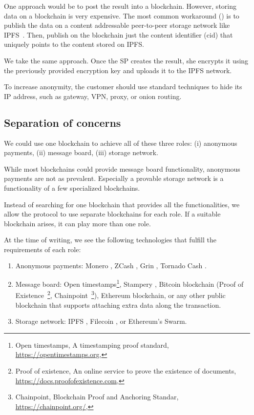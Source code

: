 One approach would be to post the result into a blockchain. However, storing data on a blockchain is very expensive. The most common workaround (\cite{shahidBlockchainBasedAgriFoodSupply2020, wangAuditableProtocolsFair2019, chenImprovedP2PFile2017}) is to publish the data on a content addressable peer-to-peer storage network like IPFS~\cite{benetIPFSContentAddressed2014}. Then, publish on the blockchain just the content identifier ($\mathrm{cid}$) that uniquely points to the content stored on IPFS.

We take the same approach. Once the SP creates the result, she encrypts it using the previously provided encryption key and uploads it to the IPFS network.

To increase anonymity, the customer should use standard techniques to hide its IP address, such as gateway, VPN, proxy, or onion routing.

\subsection{Separation of concerns}
We could use one blockchain to achieve all of these three roles: (i) anonymous payments, (ii) message board, (iii) storage network.

While most blockchains could provide message board functionality, anonymous payments are not as prevalent. Especially a provable storage network is a functionality of a few specialized blockchains.

Instead of searching for one blockchain that provides all the functionalities, we allow the protocol to use separate blockchains for each role. If a suitable blockchain arises, it can play more than one role.

At the time of writing, we see the following technologies that fulfill the requirements of each role:

\begin{enumerate}
\def\labelenumi{\arabic{enumi}.}

\item Anonymous payments: Monero \cite{vansaberhagenCryptoNote2013}, ZCash
  \cite{ben-sassonZerocashDecentralizedAnonymous2014}, Grin \cite{fuchsbauerAggregateCashSystems2019},
  Tornado Cash \cite{pertsevTornadoCashPrivacy2019}.
\item Message board: Open timestamps\footnote{Open timestamps, A timestamping proof standard, \url{https://opentimestamps.org}, \LASTVISITED}, Stampery \cite{crespoStamperyBlockchainTimestamping2017}, Bitcoin blockchain (Proof of Existence~\footnote{Proof of existence, An online service to prove the existence of documents, \url{https://docs.proofofexistence.com}, \LASTVISITED}, Chainpoint~\footnote{Chainpoint, Blockchain Proof and Anchoring Standar, \url{ https://chainpoint.org/}, \LASTVISITED}), Ethereum blockchain, or any other public blockchain that supports attaching extra data along the transaction.
\item Storage network: IPFS \cite{benetIPFSContentAddressed2014}, Filecoin
  \cite{protocollabsFilecoinDecentralizedStorage2017}, or Ethereum's
  Swarm\cite{teamSWARMStorageCommunication2021}.
\end{enumerate}

